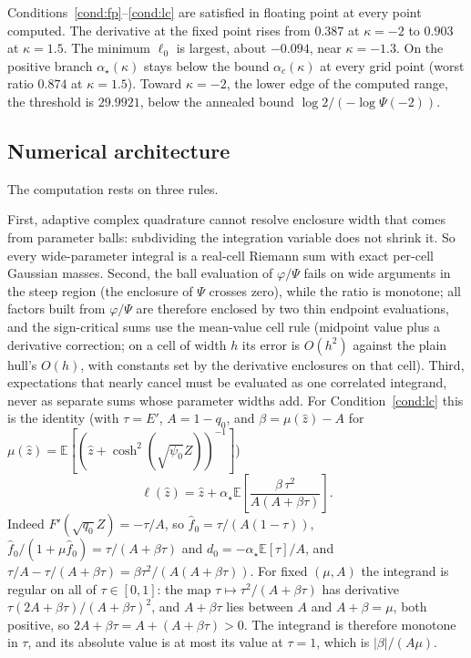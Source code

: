 \documentclass[11pt]{article}
\theoremstyle{remark}
\newcommand{\E}{\mathbb{E}}
\begin{document}
Conditions~\ref{cond:fp}--\ref{cond:lc} are satisfied in floating
point at every point computed.  The
derivative at the fixed point rises from $0.387$ at $\kappa=-2$ to
$0.903$ at $\kappa=1.5$.  The minimum $\ell_0$ is largest, about
$-0.094$, near $\kappa=-1.3$.  On the positive branch $\alpha_\star(\kappa)$
stays below the bound $\alpha_c(\kappa)$ at every grid point (worst ratio $0.874$
at $\kappa=1.5$).  Toward $\kappa=-2$, the lower edge of the computed range, the
threshold is $29.9921$, below the annealed bound
$\log2/(-\log\Psi(-2))$.


\subsection{Numerical architecture}\label{sec:architecture}

The computation rests on three rules.

First, adaptive complex quadrature cannot resolve enclosure width
that comes from parameter balls: subdividing the integration
variable does not shrink it.
So every wide-parameter integral is a real-cell Riemann sum with
exact per-cell Gaussian masses.  Second, the ball evaluation of
$\varphi/\Psi$ fails on wide arguments in the steep region (the
enclosure of $\Psi$ crosses zero), while the ratio is monotone; all
factors built from $\varphi/\Psi$ are therefore enclosed by two thin endpoint
evaluations, and the sign-critical sums use the mean-value cell rule
(midpoint value plus a derivative correction; on a cell of width $h$
its error is $O(h^2)$ against the plain hull's $O(h)$, with constants
set by the derivative enclosures on that cell).  Third, expectations that nearly cancel must be
evaluated as one correlated integrand, never as separate sums whose
parameter widths add.  For Condition~\ref{cond:lc} this is the
identity (with $\tau=E'$, $A=1-q_0$, and $\beta=\mu(\hat z)-A$ for
$\mu(\hat z)=\E[(\hat z+\cosh^2(\sqrt{\psi_0}Z))^{-1}]$)
\[
\ell(\hat z)=\hat z+\alpha_\star\E\!\left[\frac{\beta\,\tau^2}{A(A+\beta\tau)}\right].
\]
Indeed $F'(\sqrt{q_0}Z)=-\tau/A$, so $\hat f_0=\tau/(A(1-\tau))$,
$\hat f_0/(1+\mu\hat f_0)=\tau/(A+\beta\tau)$ and
$d_0=-\alpha_\star\E[\tau]/A$, and
$\tau/A-\tau/(A+\beta\tau)=\beta\tau^2/(A(A+\beta\tau))$.  For
fixed $(\mu,A)$ the integrand is regular on all of $\tau\in[0,1]$: the
map $\tau\mapsto\tau^2/(A+\beta\tau)$ has derivative
$\tau(2A+\beta\tau)/(A+\beta\tau)^2$, and $A+\beta\tau$ lies between
$A$ and $A+\beta=\mu$, both positive, so $2A+\beta\tau=A+(A+\beta\tau)>0$.
The integrand is therefore monotone in $\tau$, and its absolute value
is at most its value at $\tau=1$, which is $|\beta|/(A\mu)$.
\end{document}
